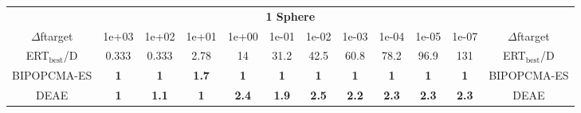 \begin{tabular}{cccccccccccc}
 & \multicolumn{10}{c}{{\normalsize \textbf{1 Sphere}}}\\
$\Delta$ftarget& 1e+03& 1e+02& 1e+01& 1e+00& 1e-01& 1e-02& 1e-03& 1e-04& 1e-05& 1e-07 & $\Delta$ftarget \\
ERT$_{\textrm{best}}$/D& 0.333& 0.333& 2.78& 14& 31.2& 42.5& 60.8& 78.2& 96.9& 131 & ERT$_{\textrm{best}}$/D \\
\hline
BIPOPCMA-ES & \textbf{1} & \textbf{1} & \textbf{1.7} & \textbf{1} & \textbf{1} & \textbf{1} & \textbf{1} & \textbf{1} & \textbf{1} & \textbf{1} & BIPOPCMA-ES \cite{add_an_entry_for_BIPOPCMA-ES_in_bbob.bib}\\
DEAE & \textbf{1} & \textbf{1.1} & \textbf{1} & \textbf{2.4} & \textbf{1.9} & \textbf{2.5} & \textbf{2.2} & \textbf{2.3} & \textbf{2.3} & \textbf{2.3} & DEAE \cite{add_an_entry_for_DEAE_in_bbob.bib}
\end{tabular}

